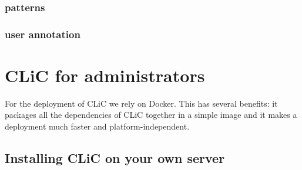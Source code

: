 \documentclass[letterpaper,10pt,english]{sphinxmanual}
\begin{document}
\subsection{patterns}
\label{endusers:patterns}

\subsection{user annotation}
\label{endusers:user-annotation}

\chapter{CLiC for administrators}
\label{admin::doc}\label{admin:clic-for-administrators}
For the deployment of CLiC we rely on Docker. This has several benefits:
it packages all the dependencies of CLiC together in a simple image and it makes
a deployment much faster and platform-independent.


\section{Installing CLiC on your own server}
\label{admin:installing-clic-on-your-own-server}
\end{document}
